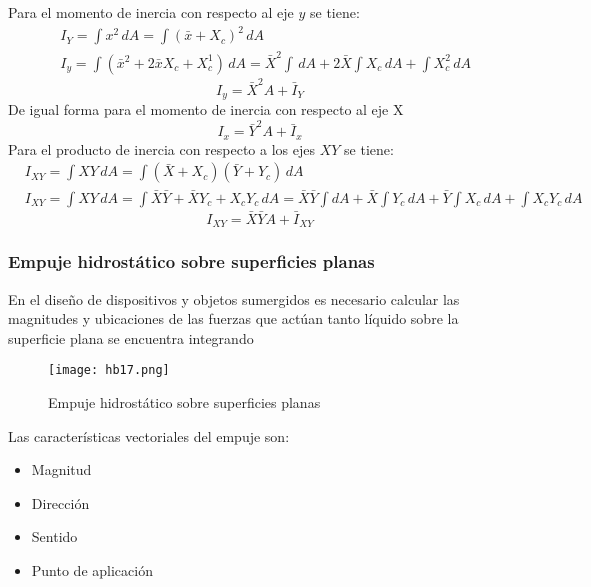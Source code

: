 \begin{theorem}
    Para el momento de inercia con respecto al eje $y$ se tiene: 
    \begin{align*}
        &I_Y=\int x^2\, dA=\int \left(\bar{x}+X_c\right)^2\, dA\\
        &I_y=\int \left(\bar{x}^2+2\bar{x}X_c+X^1_c\right)\, dA=\bar{X}^2\int \, dA+2\bar{X}\int X_c\, dA+\int X^2_c\, dA
    \end{align*}
    \begin{equation}
        I_y=\bar{X}^2A+\bar{I}_Y
    \end{equation}
    De igual forma para el momento de inercia con respecto al eje X
    \begin{equation}
        I_x=\bar{Y}^2A+\bar{I}_x
    \end{equation}
    Para el producto de inercia con respecto a los ejes $XY$ se tiene:
    \begin{align*}
        &I_{XY}=\int XY\, dA=\int \left(\bar{X}+X_c\right)\left(\bar{Y}+Y_c\right)\, dA\\
        &I_{XY}=\int XY\, dA=\int \bar{X}\bar{Y}+\bar{X}Y_c+X_cY_c\,dA=\bar{X}\bar{Y}\int dA+\bar{X}\int Y_c\, dA+\bar{Y}\int X_c\, dA+\int X_cY_c\,dA
    \end{align*}
    \begin{equation}
        I_{XY}=\bar{X}\bar{Y}A+\bar{I}_{XY}
    \end{equation}
\end{theorem}

\subsubsection{Empuje hidrostático sobre superficies planas}

En el diseño de dispositivos y objetos sumergidos es necesario calcular las magnitudes y ubicaciones de las fuerzas que actúan tanto
líquido sobre la superficie plana se encuentra integrando 

\begin{figure}[h!]
    \centering
    \texttt{[image: hb17.png]}
    \caption{Empuje hidrostático sobre superficies planas}
    \label{hb17}
\end{figure}

Las características vectoriales del empuje son: 

\begin{itemize}
    \item Magnitud
    \item Dirección
    \item Sentido
    \item Punto de aplicación
\end{itemize}

